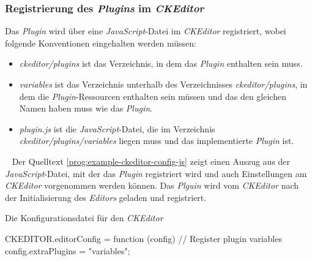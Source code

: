\subsubsection{Registrierung des \emph{Plugins} im \emph{CKEditor}}
Das \emph{Plugin} wird über eine \emph{JavaScript}-Datei im \emph{CKEditor} registriert, wobei folgende Konventionen eingehalten werden müssen:
\begin{itemize}
	\item\emph{ckeditor/plugins} ist das Verzeichnis, in dem das \emph{Plugin} enthalten sein muss.
	\item\emph{variables} ist das Verzeichnis unterhalb des Verzeichnisses \emph{ckeditor/plugins}, in dem die \emph{Plugin}-Ressourcen enthalten sein müssen und das den gleichen Namen haben muss wie das \emph{Plugin}.
	\item\emph{plugin.js} ist die \emph{JavaScript}-Datei, die im Verzeichnis \emph{ckeditor/plugins/variables} liegen muss und das implementierte \emph{Plugin} ist. 
\end{itemize}
\ \newline
Der Quelltext \ref{prog:example-ckeditor-config-js} zeigt einen Auszug aus der \emph{JavaScript}-Datei, mit der das \emph{Plugin} registriert wird und auch Einstellungen am \emph{CKEditor} vorgenommen werden können. Das \emph{Plguin} wird vom \emph{CKEditor} nach der Initialisierung des \emph{Editors} geladen und registriert.

\begin{program}[h]
\caption{Die Konfigurationsdatei für den \emph{CKEditor}}
\label{prog:example-ckeditor-config-js}
\begin{JsCode}
CKEDITOR.editorConfig = function (config) {
    // Register plugin variables
    config.extraPlugins = "variables";
}
\end{JsCode} 
\end{program}

